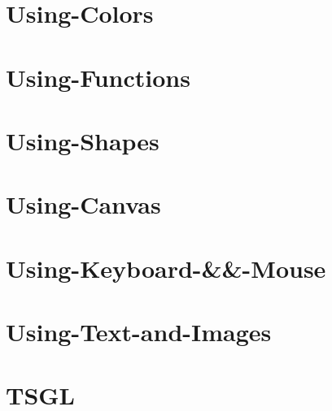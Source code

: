 \documentclass[twoside]{book}
\begin{document}
\chapter{Using-\/\-Colors}
\label{md__home_cpd5_workspace__t_s_g_l_docs-wiki_tutorials__using-_colors}
\hypertarget{md__home_cpd5_workspace__t_s_g_l_docs-wiki_tutorials__using-_colors}{}

\chapter{Using-\/\-Functions}
\label{md__home_cpd5_workspace__t_s_g_l_docs-wiki_tutorials__using-_functions}
\hypertarget{md__home_cpd5_workspace__t_s_g_l_docs-wiki_tutorials__using-_functions}{}

\chapter{Using-\/\-Shapes}
\label{md__home_cpd5_workspace__t_s_g_l_docs-wiki_tutorials__using-_shapes}
\hypertarget{md__home_cpd5_workspace__t_s_g_l_docs-wiki_tutorials__using-_shapes}{}

\chapter{Using-\/\-Canvas}
\label{md__home_cpd5_workspace__t_s_g_l_docs-wiki__using-_canvas}
\hypertarget{md__home_cpd5_workspace__t_s_g_l_docs-wiki__using-_canvas}{}

\chapter{Using-\/\-Keyboard-\/\&\&-\/\-Mouse}
\label{md__home_cpd5_workspace__t_s_g_l_docs-wiki__using-_keyboard-_6_6-_mouse}
\hypertarget{md__home_cpd5_workspace__t_s_g_l_docs-wiki__using-_keyboard-_6_6-_mouse}{}

\chapter{Using-\/\-Text-\/and-\/\-Images}
\label{md__home_cpd5_workspace__t_s_g_l_docs-wiki__using-_text-and-_images}
\hypertarget{md__home_cpd5_workspace__t_s_g_l_docs-wiki__using-_text-and-_images}{}

\chapter{T\-S\-G\-L}
\label{md__home_cpd5_workspace__t_s_g_l_readme}
\hypertarget{md__home_cpd5_workspace__t_s_g_l_readme}{}

\end{document}
